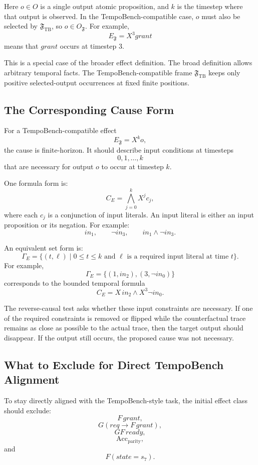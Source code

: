 \documentclass[11pt]{article}
\theoremstyle{remark}
\newcommand{\Frame}{\mathfrak{F}}
\begin{document}
Here \(o\in O\) is a single output atomic proposition, and \(k\) is the timestep
where that output is observed. In the TempoBench-compatible case, \(o\) must
also be selected by \(\Frame_{\mathrm{TB}}\), so \(o\in O_{\Frame}\). For
example,
\[
  E_{\Frame} = X^3 grant
\]
means that \(grant\) occurs at timestep \(3\).

This is a special case of the broader effect definition. The broad definition
allows arbitrary temporal facts. The TempoBench-compatible frame
\(\Frame_{\mathrm{TB}}\) keeps only positive selected-output occurrences at
fixed finite positions.

\subsection{The Corresponding Cause Form}

For a TempoBench-compatible effect
\[
  E_{\Frame}=X^k o,
\]
the cause is finite-horizon. It should describe input conditions at timesteps
\[
  0,1,\ldots,k
\]
that are necessary for output \(o\) to occur at timestep \(k\).

One formula form is:
\[
  C_E =
  \bigwedge_{j=0}^{k} X^j c_j,
\]
where each \(c_j\) is a conjunction of input literals. An input literal is
either an input proposition or its negation. For example:
\[
  in_1,\qquad
  \neg in_3,\qquad
  in_1\land \neg in_3.
\]

An equivalent set form is:
\[
  \Gamma_E = \{(t,\ell)\mid 0\leq t\leq k
  \text{ and } \ell \text{ is a required input literal at time } t\}.
\]
For example,
\[
  \Gamma_E=\{(1,in_2),(3,\neg in_0)\}
\]
corresponds to the bounded temporal formula
\[
  C_E = X\,in_2 \land X^3\neg in_0.
\]

The reverse-causal test asks whether these input constraints are necessary. If
one of the required constraints is removed or flipped while the counterfactual
trace remains as close as possible to the actual trace, then the target output
should disappear. If the output still occurs, the proposed cause was not
necessary.

\subsection{What to Exclude for Direct TempoBench Alignment}

To stay directly aligned with the TempoBench-style task, the initial effect
class should exclude:
\[
  F\,grant,
\]
\[
  G(req\rightarrow F\,grant),
\]
\[
  GF\,ready,
\]
\[
  \mathrm{Acc}_{\mathrm{parity}},
\]
and
\[
  F(state=s_7).
\]
\end{document}
